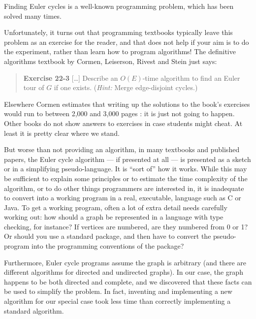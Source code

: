 \documentclass[12pt]{article}
\begin{document}
Finding Euler cycles is a well-known programming problem, which has been solved many times.

Unfortunately, it turns out that programming textbooks typically leave this problem as an exercise for the reader, and that does not help if your aim is to do the experiment, rather than learn how to program algorithms! The definitive algorithms textbook by Cormen, Leiserson, Rivest and Stein \cite{cormen} just says: %

\begin{quote}
\textbf{Exercise 22-3} [\ldots]
Describe an $O(E)$-time algorithm to find an Euler tour of $G$ if one exists. (\emph{Hint:\/} Merge edge-disjoint cycles.)
\end{quote}

Elsewhere Cormen estimates that writing up the solutions to the book's exercises would run to between 2,000 and 3,000 pages \cite{cormen-web}: it is just not going to happen. Other books do not show answers to exercises in case students might cheat. At least it is pretty clear where we stand. 

But worse than not providing an algorithm, in many textbooks and published papers, the Euler cycle algorithm --- if presented at all ---  is presented as a sketch or in a simplifying pseudo-language. It is ``sort of'' how it works. While this may be sufficient to explain some principles or to estimate the time complexity of the algorithm, or to do other things programmers are interested in, it is inadequate to convert into a working program in a real, executable, language such as C or Java. To get a working program, often a lot of extra detail needs carefully working out: how should a graph be represented in a language with type checking, for instance? If vertices are numbered, are they numbered from 0 or 1? Or should you use a standard package, and then have to convert the pseudo-program into the programming conventions of the package?

Furthermore, Euler cycle programs assume the graph is arbitrary (and there are different algorithms for directed and undirected graphs). In our case, the graph happens to be both directed and complete, and we discovered that these facts can be used to simplify the problem. In fact, inventing and implementing a new algorithm for our special case took less time than correctly implementing a standard algorithm. 
\end{document}
